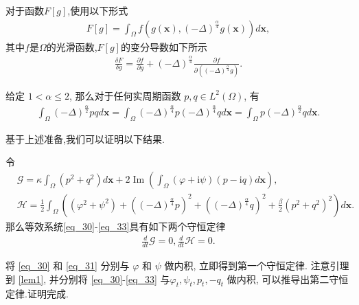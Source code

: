 \begin{lem}\label{lem2}
对于函数$F[g]$,使用以下形式
\begin{align}\label{eq_25}
F[g]=\int_{\Omega} f\left(g(\boldsymbol{x}),(-\Delta)^{\frac{\alpha}{4}} g(\boldsymbol{x})\right) d \boldsymbol{x},
\end{align}
其中$f$是$\Omega$的光滑函数,$F[g]$的变分导数如下所示
\begin{align}\label{eq_26}
\frac{\delta F}{\delta g}=\frac{\partial f}{\partial g}+(-\Delta)^{\frac{\alpha}{4}} \frac{\partial f}{\partial\left((-\Delta)^{\frac{\alpha}{4}} g\right)} .
\end{align}
\end{lem}

\begin{lem}\label{lem1}
 给定 $1<\alpha \leq 2$, 那么对于任何实周期函数 $p, q \in L^{2}(\Omega)$, 有
\begin{align}\label{eq_22}
\int_{\Omega}(-\Delta)^{\frac{\alpha}{2}} p q d \boldsymbol{x}=\int_{\Omega}(-\Delta)^{\frac{\alpha}{4}} p(-\Delta)^{\frac{\alpha}{4}} q d \boldsymbol{x}=\int_{\Omega} p(-\Delta)^{\frac{\alpha}{2}} q d \boldsymbol{x}.
\end{align}
\end{lem}


基于上述准备,我们可以证明以下结果.
\begin{thm}	\label{thm2_1}
令
\begin{align}
&\mathcal{G}=\kappa\int_{\Omega}(p^2+q^2) d \boldsymbol{x}+2\operatorname{Im}(\int_{\Omega}(\varphi+\mathrm{i}\psi)(p-\mathrm{i}q)d \boldsymbol{x}),\label{eq_34} \\
&\mathcal{H}=\frac{1}{2}\int_{\Omega}\left((\varphi^2+\psi^2)+\left((-\Delta)^{\frac{\alpha}{4}} p\right)^{2}+\left((-\Delta)^{\frac{\alpha}{4}} q\right)^{2}+\frac{\beta}{2}(p^2+q^2)^{2}\right) d \boldsymbol{x}.\label{eq_35}
\end{align}
那么等效系统\eqref{eq_30}-\eqref{eq_33}具有如下两个守恒定律
\begin{align}
\frac{d}{d t} \mathcal{G}=0, \frac{d}{d t} \mathcal{H}=0.
\end{align}
\end{thm}

\begin{pf}
将 \eqref{eq_30} 和 \eqref{eq_31} 分别与 $\varphi$ 和 $\psi$ 做内积, 立即得到第一个守恒定律.
注意引理到 \ref{lem1}, 并分别将 \eqref{eq_30}-\eqref{eq_33} 与$\varphi_{t}, \psi_{t}, p_{t},-q_{t}$ 做内积, 可以推导出第二守恒定律.证明完成.
\end{pf}

